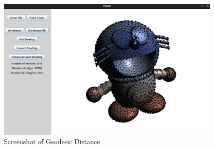 \documentclass[12pt]{article}
\begin{document}
\begin{figure}[h]
    \centering
    \includegraphics[width=1.0\textwidth]{sc6.png}
    \caption{Screenshot of Geodesic Distance}
    \label{fig:my_label}
\end{figure}
\end{document}
